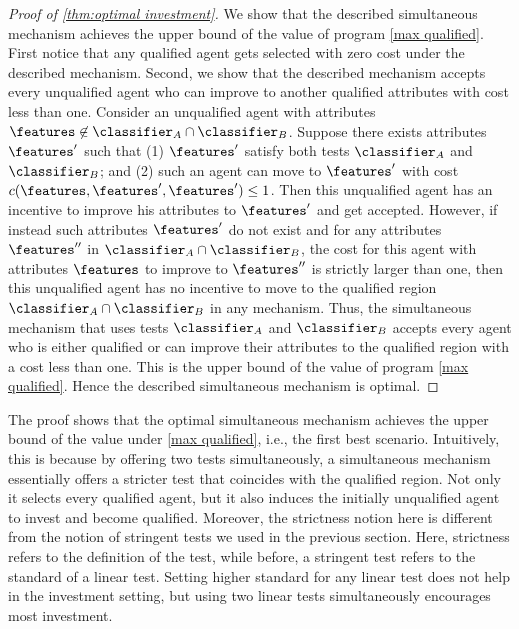 \begin{proof}[Proof of \cref{thm:optimal investment}]
    We show that the described simultaneous mechanism achieves the upper bound of the value of program \ref{max qualified}. 
    First notice that any qualified agent gets selected with zero cost under the described mechanism.
    Second, we show that the described mechanism accepts every unqualified agent who can improve to another qualified attributes with cost less than one.
    Consider an unqualified agent with attributes $\features\not\in\classifier_A \cap \classifier_B$. 
    Suppose there exists attributes $\features'$ such that (1)  $\features'$ satisfy both tests $\classifier_A$ and $\classifier_B$; and (2)  such an agent can move to $\features'$ with cost $c(\features, \features', \features') \leq 1$.
    Then this unqualified agent has an incentive  to improve his attributes to $\features'$ and get accepted.  
    However, if instead such attributes $\features'$ do not exist and for any attributes $\features''$ in $\classifier_A \cap \classifier_B$, the cost for this agent with attributes $\features$ to improve to $\features''$ is strictly larger than one, then this unqualified agent has no incentive to move to the qualified region $\classifier_A \cap \classifier_B$ in any mechanism.
    Thus, the simultaneous mechanism that uses tests $\classifier_A$ and $\classifier_B$ accepts every agent who is either qualified or can improve their attributes to the qualified region with a cost less than one. 
    This is the upper bound of the value of program \ref{max qualified}.
    Hence the described simultaneous mechanism is optimal.
\end{proof}

The proof shows that the optimal simultaneous mechanism achieves the upper bound of the value under \ref{max qualified}, i.e., the first best scenario.
Intuitively, this is because by offering two tests simultaneously, a simultaneous mechanism essentially offers a stricter test that coincides with the qualified region. 
Not only it selects every qualified agent, but it also induces the initially unqualified agent to invest and become qualified.
Moreover, the strictness notion here is different from the notion of  stringent tests we used in the previous section.
Here, strictness refers to the definition of the test, while before, a stringent test refers to the standard of a linear test.
Setting higher standard for any linear test does not help in the investment setting, but using two linear tests simultaneously encourages most investment.

